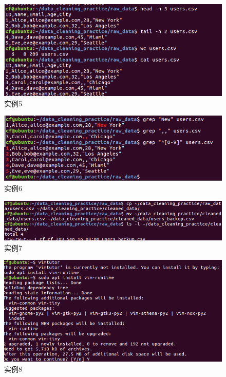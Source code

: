 \documentclass[cn,12pt]{report}
\begin{document}
    \begin{figure}[htbp]
    \centering
    \includegraphics[width=1\textwidth]{image/5.png}
    \caption{实例5}
  \end{figure}

    \begin{figure}[htbp]
    \centering
    \includegraphics[width=1\textwidth]{image/6.png}
    \caption{实例6}
  \end{figure}

    \begin{figure}[htbp]
    \centering
    \includegraphics[width=1\textwidth]{image/7.png}
    \caption{实例7}
  \end{figure}

    \begin{figure}[htbp]
    \centering
    \includegraphics[width=1\textwidth]{image/8.png}
    \caption{实例8}
  \end{figure}
\end{document}
